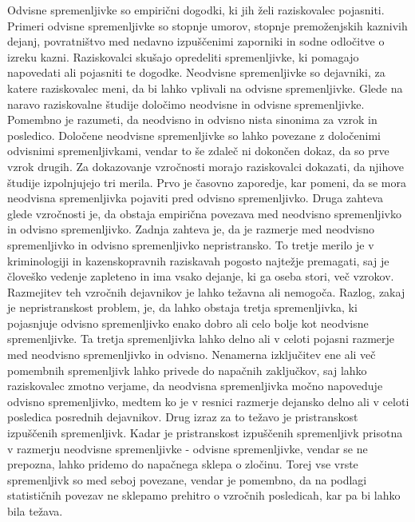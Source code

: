 \documentclass[12pt,a4paper]{amsart}
\theoremstyle{definition} %
\theoremstyle{plain} %
\begin{document}
Odvisne spremenljivke so empirični dogodki, ki jih želi raziskovalec pojasniti. Primeri odvisne spremenljivke so stopnje umorov, stopnje premoženjskih 
kaznivih dejanj, povratništvo med nedavno izpuščenimi zaporniki in sodne odločitve o izreku kazni. Raziskovalci skušajo opredeliti spremenljivke, 
ki pomagajo napovedati ali pojasniti te dogodke. Neodvisne spremenljivke so dejavniki, za katere raziskovalec meni, da bi lahko vplivali na odvisne 
spremenljivke. Glede na naravo raziskovalne študije določimo neodvisne in odvisne spremenljivke.\\
Pomembno je razumeti, da neodvisno in odvisno nista sinonima za vzrok in posledico. Določene neodvisne spremenljivke so lahko povezane z določenimi 
odvisnimi spremenljivkami, vendar to še zdaleč ni dokončen dokaz, da so prve vzrok drugih. Za dokazovanje vzročnosti morajo raziskovalci dokazati, 
da njihove študije izpolnjujejo tri merila. Prvo je časovno zaporedje, kar pomeni, da se mora neodvisna spremenljivka pojaviti pred odvisno spremenljivko. 
Druga zahteva glede vzročnosti je, da obstaja empirična povezava med neodvisno spremenljivko in odvisno spremenljivko. Zadnja zahteva je, da je razmerje 
med neodvisno spremenljivko in odvisno spremenljivko nepristransko. To tretje merilo je v kriminologiji in kazenskopravnih raziskavah pogosto najtežje 
premagati, saj je človeško vedenje zapleteno in ima vsako dejanje, ki ga oseba stori, več vzrokov. Razmejitev teh vzročnih dejavnikov je lahko težavna 
ali nemogoča. Razlog, zakaj je nepristranskost problem, je, da lahko obstaja tretja spremenljivka, ki pojasnjuje odvisno spremenljivko enako dobro ali 
celo bolje kot neodvisne spremenljivke. Ta tretja spremenljivka lahko delno ali v celoti pojasni razmerje med neodvisno spremenljivko in odvisno. Nenamerna 
izključitev ene ali več pomembnih spremenljivk lahko privede do napačnih zaključkov, saj lahko raziskovalec zmotno verjame, da neodvisna spremenljivka močno 
napoveduje odvisno spremenljivko, medtem ko je v resnici razmerje dejansko delno ali v celoti posledica posrednih dejavnikov. Drug izraz za to težavo je 
pristranskost izpuščenih spremenljivk. Kadar je pristranskost izpuščenih spremenljivk prisotna v razmerju neodvisne spremenljivke - odvisne spremenljivke, 
vendar se ne prepozna, lahko pridemo do napačnega sklepa o zločinu. Torej vse vrste spremenljivk so med seboj povezane, vendar je pomembno, da na 
podlagi statističnih povezav ne sklepamo prehitro o vzročnih posledicah, kar pa bi lahko bila težava.\\\\
\end{document}
